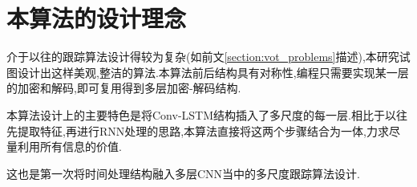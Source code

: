 \section{本算法的设计理念}
介于以往的跟踪算法设计得较为复杂(如前文\ref{section:vot_problems}描述),本研究试图设计出这样美观,整洁的算法.本算法前后结构具有对称性,编程只需要实现某一层的加密和解码,即可复用得到多层加密-解码结构.
\par
本算法设计上的主要特色是将Conv-LSTM结构插入了多尺度的每一层.相比于以往先提取特征,再进行RNN处理的思路,本算法直接将这两个步骤结合为一体,力求尽量利用所有信息的价值.
\par
这也是第一次将时间处理结构融入多层CNN当中的多尺度跟踪算法设计.

